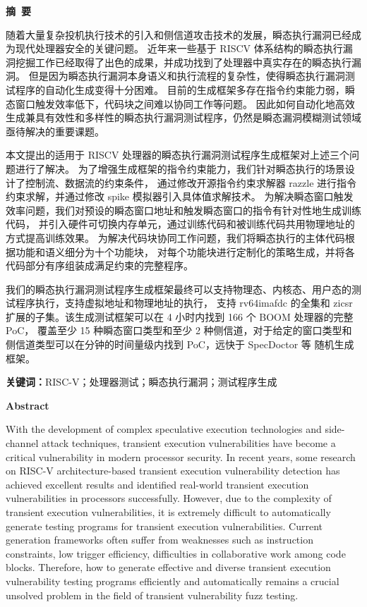 \cleardoublepage{}
\begin{center}
    \bfseries {} 摘~要
\end{center}

随着大量复杂投机执行技术的引入和侧信道攻击技术的发展，瞬态执行漏洞已经成为现代处理器安全的关键问题。
近年来一些基于 RISCV 体系结构的瞬态执行漏洞挖掘工作已经取得了出色的成果，并成功找到了处理器中真实存在的瞬态执行漏洞。
但是因为瞬态执行漏洞本身语义和执行流程的复杂性，使得瞬态执行漏洞测试程序的自动化生成变得十分困难。
目前的生成框架多存在指令约束能力弱，瞬态窗口触发效率低下，代码块之间难以协同工作等问题。
因此如何自动化地高效生成兼具有效性和多样性的瞬态执行漏洞测试程序，仍然是瞬态漏洞模糊测试领域亟待解决的重要课题。\par

本文提出的适用于 RISCV 处理器的瞬态执行漏洞测试程序生成框架对上述三个问题进行了解决。
为了增强生成框架的指令约束能力，我们针对瞬态执行的场景设计了控制流、数据流的约束条件，
通过修改开源指令约束求解器 razzle 进行指令约束求解，并通过修改 spike 模拟器引入具体值求解技术。
为解决瞬态窗口触发效率问题，我们对预设的瞬态窗口地址和触发瞬态窗口的指令有针对性地生成训练代码，
并引入硬件可切换内存单元，通过训练代码和被训练代码共用物理地址的方式提高训练效果。
为解决代码块协同工作问题，我们将瞬态执行的主体代码根据功能和语义细分为十个功能块，
对每个功能块进行定制化的策略生成，并将各代码部分有序组装成满足约束的完整程序。\par

我们的瞬态执行漏洞测试程序生成框架最终可以支持物理态、内核态、用户态的测试程序执行，支持虚拟地址和物理地址的执行，
支持 rv64imafdc 的全集和 zicsr 扩展的子集。该生成测试框架可以在 4 小时内找到 166 个 BOOM 处理器的完整 PoC，
覆盖至少 15 种瞬态窗口类型和至少 2 种侧信道，对于给定的窗口类型和侧信道类型可以在分钟的时间量级内找到 PoC，远快于 SpecDoctor 等
随机生成框架。\par

\textbf{关键词：}RISC-V；处理器测试；瞬态执行漏洞；测试程序生成

\cleardoublepage{}
\begin{center}
    \bfseries {} Abstract
\end{center}

With the development of complex speculative execution technologies 
and side-channel attack techniques, transient execution vulnerabilities have become a critical vulnerability
in modern processor security. In recent years, 
some research on RISC-V architecture-based transient execution vulnerability detection 
has achieved excellent results and identified real-world transient execution vulnerabilities in processors successfully.
However, due to the complexity of transient execution vulnerabilities, 
it is extremely difficult to automatically generate testing programs for transient execution vulnerabilities.
Current generation frameworks often suffer from weaknesses 
such as instruction constraints, 
low trigger efficiency, difficulties in collaborative work among code blocks. 
Therefore, how to generate effective and diverse transient execution vulnerability testing programs  efficiently and automatically 
remains a crucial unsolved problem in the field of transient vulnerability fuzz testing.\par

